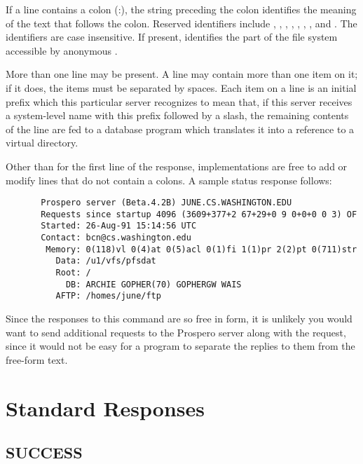 If a line contains a colon (:), the string preceding the colon
identifies the meaning of the text that follows the colon.  Reserved
identifiers include , , ,
, , , , and .  The
identifiers are case insensitive.  If present,  
identifies the part of the file system accessible by anonymous .

More than one  line may be present.  A  line may
contain more than 
one item on it; if it does, the items must be separated by spaces.
Each item on a  line is an initial prefix which this particular
server recognizes to mean that, if this server receives a system-level
name with this prefix followed by a slash, the remaining contents of
the line are fed to a database program which translates it into a
reference to a virtual directory.  

Other than for the first line of the response, implementations are
free to add or modify lines that do not contain a colons.  A sample
status response follows:

\begin{verbatim}
       Prospero server (Beta.4.2B) JUNE.CS.WASHINGTON.EDU
       Requests since startup 4096 (3609+377+2 67+29+0 9 0+0+0 0 3) OF
       Started: 26-Aug-91 15:14:56 UTC
       Contact: bcn@cs.washington.edu
        Memory: 0(118)vl 0(4)at 0(5)acl 0(1)fi 1(1)pr 2(2)pt 0(711)str
          Data: /u1/vfs/pfsdat
          Root: /
            DB: ARCHIE GOPHER(70) GOPHERGW WAIS
          AFTP: /homes/june/ftp
\end{verbatim}

Since the responses to this command are so free in form, it is
unlikely you would want to send additional requests to the Prospero
server along with the  request, since it would not be easy for a
program to separate the replies to them from the free-form text.

\chapter{Standard Responses}

\section{SUCCESS}

\begin{command}
\commandsize
 \protect{} \zoos\protect{}\zooe
\end{command}

